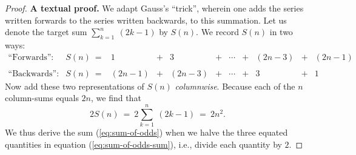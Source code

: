 \begin{proof}
{\bf A textual proof.}
%
We adapt Gauss's ``trick'', wherein one adds the series written
forwards to the series written backwards, to this summation.  Let us
denote the target sum $\sum_{k=1}^n \ (2k-1)$ by $S(n)$.  We record
$S(n)$ in two ways:
\begin{equation}
\label{eq:add-odds}
\begin{array}{llccccccccc}
\mbox{``Forwards'':} &
S(n) \ = 
& 1 & + & 3 & + & \cdots & + & (2n-3) & + & (2n-1) \\
 & & & & & & & & & &  \\
\mbox{``Backwards'':} &
S(n) \ =
& (2n-1) & + & (2n-3) & + & \cdots & + & 3 & + & 1
\end{array}
\end{equation}
Now add these two representations of $S(n)$ {\em columnwise}.  Because
each of the $n$ column-sums equals $2n$, we find that
\begin{equation}
\label{eq:sum-of-odds-sum}
2 S(n) \ = \ 2 \sum_{k=1}^n \ (2k-1) \ = \ 2n^2.
\end{equation}
We thus derive the sum (\ref{eq:sum-of-odds}) when we halve the three
equated quantities in equation (\ref{eq:sum-of-odds-sum}), i.e.,
divide each quantity by $2$.
\end{proof}

\medskip

